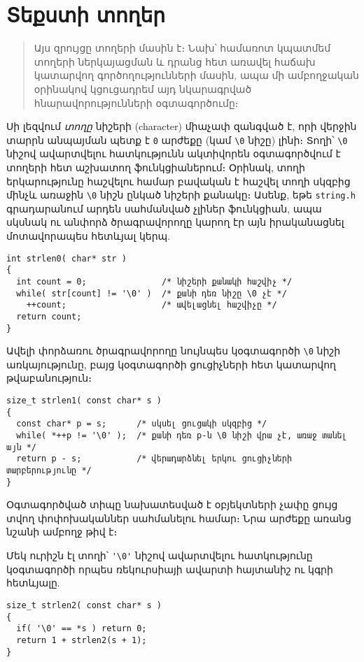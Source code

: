 \chapter{Տեքստի տողեր}

\begin{quote}
Այս զրույցը տողերի մասին է։ Նախ՝ համառոտ կպատմեմ տողերի
ներկայացման և դրանց հետ առավել հաճախ կատարվող գործողությունների
մասին, ապա մի ամբողջական օրինակով կցուցադրեմ այդ նկարագրված
հնարավորությունների օգտագործումը։
\end{quote}

Սի լեզվում \emph{տողը} նիշերի (character) միաչափ զանգված է, որի
վերջին տարրն անպայման պետք է \texttt{0} արժեքը (կամ \verb|\0|
նիշը) լինի։ Տողի՝ \Verb|\0| նիշով ավարտվելու հատկությունն ակտիվորեն
օգտագործվում է տողերի հետ աշխատող ֆունկցիաներում։ Օրինակ, տողի
երկարությունը հաշվելու համար բավական է հաշվել տողի սկզբից մինչև
առաջին \Verb|\0| նիշն ընկած նիշերի քանակը։ Ասենք, եթե
\texttt{string.h} գրադարանում արդեն սահմանված չլիներ 
 ֆունկցիան, ապա սկսնակ ու անփորձ ծրագրավորողը կարող էր այն
 իրականացնել մոտավորապես հետևյալ կերպ.

\begin{Verbatim}
int strlen0( char* str )
{
  int count = 0;               /* նիշերի քանակի հաշվիչ */
  while( str[count] != '\0' )  /* քանի դեռ նիշը \0 չէ */
    ++count;                   /* ավելացնել հաշվիչը */
  return count;
}
\end{Verbatim}

Ավելի փորձառու ծրագրավորողը նույնպես կօգտագործի \Verb|\0| նիշի
առկայությունը, բայց կօգտագործի ցուցիչների հետ կատարվող թվաբանություն։

\begin{Verbatim}
size_t strlen1( const char* s )
{
  const char* p = s;      /* սկսել ցուցակի սկզբից */
  while( *++p != '\0' );  /* քանի դեռ p-ն \0 նիշի վրա չէ, առաջ տանել այն */
  return p - s;           /* վերադարձնել երկու ցուցիչների տարբերությունը */
}
\end{Verbatim}

Օգտագործված  տիպը նախատեսված է օբյեկտների չափը
ցույց տվող փոփոխականներ սահմանելու համար։ Նրա արժեքը առանց
նշանի ամբողջ թիվ է։

Մեկ ուրիշն էլ տողի՝ \Verb|'\0'| նիշով ավարտվելու հատկությունը
կօգտագործի որպես ռեկուրսիայի ավարտի հայտանիշ ու կգրի հետևյալը.

\begin{Verbatim}
size_t strlen2( const char* s )
{
  if( '\0' == *s ) return 0;
  return 1 + strlen2(s + 1);
}
\end{Verbatim}

